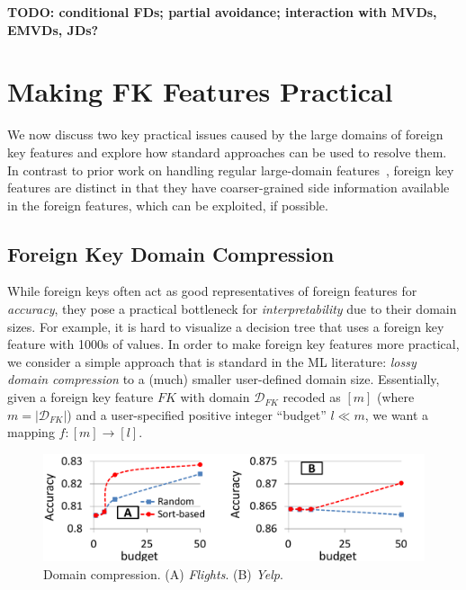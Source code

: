 \documentclass{vldb}
\begin{document}
\textbf{TODO: conditional FDs; partial avoidance; interaction with MVDs, EMVDs, JDs?}

\section{Making FK Features Practical}

We now discuss two key practical issues caused by the large domains of foreign key features and explore how standard approaches can be used to resolve them. 
In contrast to prior work on handling regular large-domain features~\cite{dtreebias1}, foreign key features are distinct in that they have coarser-grained 
side information available in the foreign features, which can be exploited, if possible.

\subsection{Foreign Key Domain Compression}

While foreign keys often act as good representatives of foreign features for \textit{accuracy},
they pose a practical bottleneck for \textit{interpretability} due to their domain sizes.
For example, it is hard to visualize a decision tree that uses a foreign key feature with 1000s of values.
In order to make foreign key features more practical, we consider a simple approach that is standard in the ML literature:
\textit{lossy domain compression} to a (much) smaller user-defined domain size. Essentially, given a 
foreign key feature $FK$ with domain $\mathcal{D}_{FK}$ recoded as $[m]$ (where $m = |\mathcal{D}_{FK}|$) and a user-specified 
positive integer ``budget'' $l \ll m$, we want a mapping $f: [m] \rightarrow [l]$.

\begin{figure}[t]
\centering
\includegraphics[width=0.99\linewidth]{dom_comp.pdf}
\caption{Domain compression. (A) \textit{Flights}. (B) \textit{Yelp}.}
\label{Figure:Compression}
\end{figure}
\end{document}

